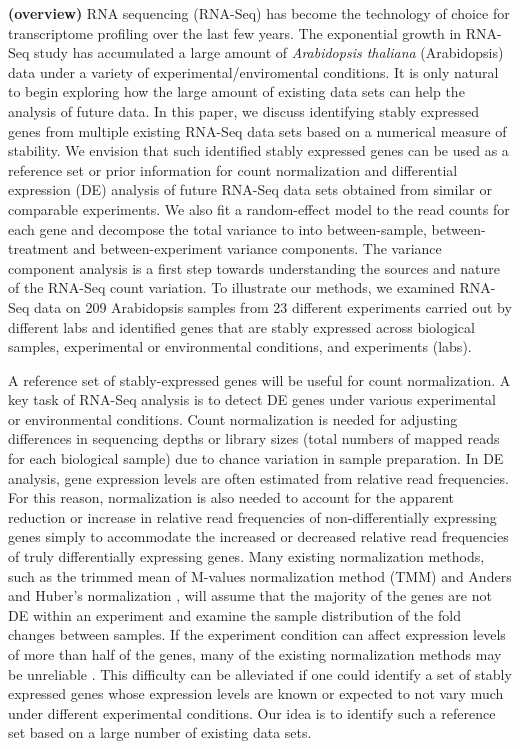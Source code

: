 \documentclass[letterpaper,12pt]{article}
\begin{document}
\textbf{(overview)}
RNA sequencing (RNA-Seq) has become the technology of choice for transcriptome
profiling over the last few years. The exponential growth in RNA-Seq study has
accumulated a large amount of \textit{Arabidopsis thaliana} (Arabidopsis) data under a variety of
experimental/enviromental conditions.  It is only natural to begin exploring
how the large amount of existing data sets can help the analysis of future
data.  In this paper, we discuss identifying stably expressed genes from
multiple existing RNA-Seq data sets based on a numerical measure of stability.
We envision that such identified stably expressed genes can be used as a
reference set or prior information for count normalization and differential
expression (DE) analysis of future RNA-Seq data sets obtained from similar or
comparable experiments.  We also fit a random-effect model to the read counts
for each gene and decompose the total variance to into between-sample,
between-treatment and between-experiment variance components. The variance component
analysis is a first step towards understanding the sources and nature of the
RNA-Seq count variation.  To illustrate our methods, we examined RNA-Seq data
on 209 Arabidopsis  samples from 23 different experiments carried out by
different labs and identified genes that are stably expressed across
biological samples, experimental or environmental conditions, and experiments
(labs).  

A reference set of stably-expressed genes will be useful for count
normalization.  A key task of RNA-Seq analysis is to detect DE genes under
various experimental or environmental conditions. Count normalization is
needed for adjusting differences in sequencing depths or library sizes (total
numbers of mapped reads for each biological sample) due to chance variation in
sample preparation.  In DE analysis, gene expression levels are often
estimated from relative read frequencies. For this reason, normalization is
also needed to account for the apparent reduction or increase in relative read
frequencies of non-differentially expressing genes simply to accommodate the
increased or decreased relative read frequencies of truly differentially
expressing genes.  Many existing normalization methods, such as the trimmed
mean of M-values normalization method (TMM) \citep{robinson2010scaling} and
Anders and Huber's normalization \citep{anders2010differential}, will  assume that the
majority of the genes are not DE within an experiment and examine the sample
distribution of the fold changes between samples.
If the experiment condition can affect expression levels of more than half of
the genes, many of the existing normalization methods may be unreliable
\citep{loven2012revisiting, wu2013use}.  This difficulty can be
alleviated if one could identify a set of stably expressed genes whose
expression levels are known or expected to not vary much under different
experimental conditions. Our idea is to identify such a reference set based on
a large number of existing data sets.
\end{document}
